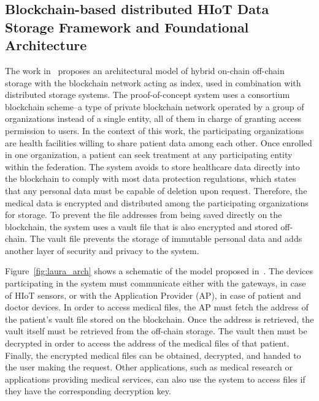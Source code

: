 \documentclass[cic,tc,english]{iiufrgs}
\numberwithin{algorithm}{chapter}
\begin{document}
        \subsection{Blockchain-based distributed HIoT Data Storage Framework and Foundational Architecture}
            The work in~\cite{laura2023} proposes an architectural model of hybrid on-chain off-chain storage with the blockchain network acting as index, used in combination with distributed storage systems.  The proof-of-concept system uses a consortium blockchain scheme--a type of private blockchain network operated by a group of organizations instead of a single entity, all of them in charge of granting access permission to users. In the context of this work, the participating organizations are health facilities willing to share patient data among each other. Once enrolled in one organization, a patient can seek treatment at any participating entity within the federation. The system avoids to store healthcare data directly into the blockchain to comply with most data protection regulations, which states that any personal data must be capable of deletion upon request.  Therefore, the medical data is encrypted and distributed among the participating organizations for storage. To prevent the file addresses from being saved directly on the blockchain, the system uses a vault file that is also encrypted and stored off-chain. The vault file prevents the storage of immutable personal data and adds another layer of security and privacy to the system.

            Figure~\ref{fig:laura_arch} shows a schematic of the model proposed in~\cite{laura2023}. The devices participating in the system must communicate either with the gateways, in case of HIoT sensors, or with the Application Provider (AP), in case of patient and doctor devices. In order to access medical files, the AP must fetch the address of the patient's vault file stored on the blockchain. Once the address is retrieved, the vault itself must be retrieved from the off-chain storage. The vault then must be decrypted in order to access the address of the medical files of that patient. Finally, the encrypted medical files can be obtained, decrypted, and handed to the user making the request. Other applications, such as medical research or applications providing medical services, can also use the system to access files if they have the corresponding decryption key.
\end{document}
